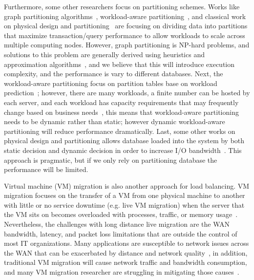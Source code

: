 Furthermore, some other researchers focus on partitioning schemes. Works like graph partitioning algorithms~\cite{Karypis:1998:FHQ:305219.305248}, workload-aware partitioning~\cite{Scholl:2009:WDP:1516360.1516366}, and classical work on physical design and partitioning~\cite{Zilio:1998:PDD:928651} are focusing on dividing data into partitions that maximize transaction/query performance to allow workloads to scale across multiple computing nodes. However, graph partitioning is NP-hard problems, and solutions to this problem are generally derived using heuristics and approximation algorithms~\cite{citeulike:11192678}, and we believe that this will introduce execution complexity, and the performance is vary to different databases. Next, the workload-aware partitioning focus on partition tables base on workload prediction~\cite{Scholl:2009:WDP:1516360.1516366, Mit-Shinobi}; however, there are many workloads, a ﬁnite number can be hosted by each server, and each workload has capacity requirements that may frequently change based on business needs~\cite{Gmach:2007:WAD:1524302.1524818}, this means that workload-aware partitioning needs to be dynamic rather than static; however dynamic workload-aware partitioning will reduce performance dramatically. Last, some other works on physical design and partitioning allows database loaded into the system by both static decision and dynamic decision in order to increase I/O bandwidth~\cite{Zilio:1998:PDD:928651}. This approach is pragmatic, but if we only rely on partitioning database the performance will be limited.
 
Virtual machine (VM) migration is also another approach for load balancing. VM migration focuses on the transfer of a VM from one physical machine to another with little or no service downtime (e.g. live VM migration) when the server that the VM sits on becomes overloaded with processes, traffic, or memory usage~\cite{Clark:2005:LMV:1251203.1251223}. Nevertheless, the challenges with long distance live migration are the WAN bandwidth, latency, and packet loss limitations that are outside the control of most IT organizations. Many applications are susceptible to network issues across the WAN that can be exacerbated by distance and network quality~\cite{murphyVMWare}, in addition, traditional VM migration will cause network traffic and bandwidth consumption, and many VM migration researcher are struggling in mitigating those causes~\cite{Liu:2009:LMV:1551609.1551630}.
